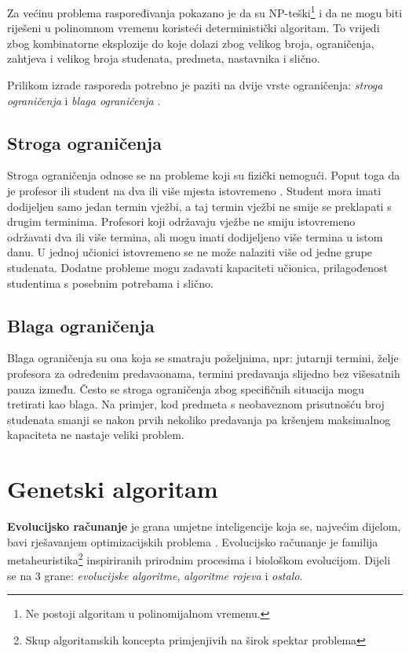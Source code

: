 \documentclass[times, utf8, zavrsni]{fer}
\begin{document}
Za većinu problema raspoređivanja pokazano je da su NP-teški\footnote{Ne postoji algoritam u polinomijalnom vremenu.} i da ne mogu biti riješeni u polinomnom vremenu koristeći deterministički algoritam. To vrijedi zbog kombinatorne eksplozije do koje dolazi zbog velikog broja, ograničenja, zahtjeva i velikog broja studenata, predmeta, nastavnika i slično.

Prilikom izrade rasporeda potrebno je paziti na dvije vrste ograničenja: \emph{stroga ograničenja}  i \emph{blaga ograničenja} .

\section{Stroga ograničenja}

Stroga ograničenja odnose se na probleme koji su fizički nemogući. Poput toga da je profesor ili student na dva ili više mjesta istovremeno \citep{herath2017genetic}. Student mora imati dodijeljen samo jedan termin vježbi, a taj termin vježbi ne smije se preklapati s drugim terminima. Profesori koji održavaju vježbe ne smiju istovremeno održavati dva ili više termina, ali mogu imati dodijeljeno više termina u istom danu. U jednoj učionici istovremeno se ne može nalaziti više od jedne grupe studenata. Dodatne probleme mogu zadavati kapaciteti učionica, prilagođenost studentima s posebnim potrebama i slično.

\section{Blaga ograničenja}
Blaga ograničenja su ona koja se smatraju poželjnima, npr: jutarnji termini, želje profesora za određenim predavaonama, termini predavanja slijedno bez višesatnih pauza između. Često se stroga ograničenja zbog specifičnih situacija mogu tretirati kao blaga. Na primjer, kod predmeta s neobaveznom prisutnošću broj studenata smanji  se nakon prvih nekoliko predavanja pa kršenjem maksimalnog kapaciteta ne nastaje veliki problem.

\chapter{Genetski algoritam}
\textbf{Evolucijsko računanje} je grana umjetne inteligencije koja se, najvećim dijelom, bavi rješavanjem optimizacijskih problema \citep{cupic-disertacija}. Evolucijsko računanje je familija metaheuristika\footnote{Skup algoritamskih koncepta primjenjivih na širok spektar problema} inspiriranih prirodnim procesima i biološkom evolucijom. Dijeli se na  3 grane: \emph{evolucijske algoritme}, \emph{algoritme rojeva} i \emph{ostalo}. 
\end{document}
